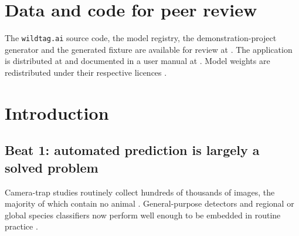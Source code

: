 \documentclass[11pt]{article}
\begin{document}
\section*{Data and code for peer review}

The \texttt{wildtag.ai} source code, the model registry, the demonstration-project
generator and the generated fixture are available for review at . The application is distributed at 
and documented in a user manual at . Model weights are
redistributed under their respective licences \cw.

\section{Introduction}

\subsection*{Beat 1: automated prediction is largely a solved problem}
Camera-trap studies routinely collect hundreds of thousands of images, the
majority of which contain no animal \cw. General-purpose detectors \cw and
regional or global species classifiers \cw now perform well enough to be
embedded in routine practice \cw.
\end{document}
